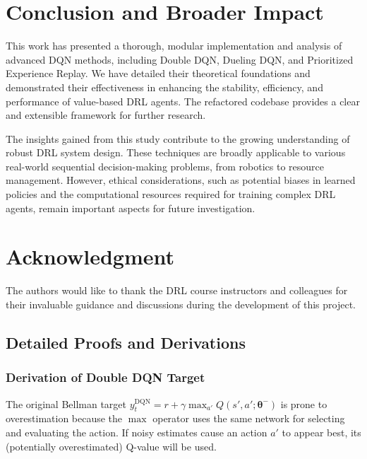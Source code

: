 \documentclass[conference]{IEEEtran}
\newcommand{\thetab}{\boldsymbol{\theta}}
\begin{document}
\section{Conclusion and Broader Impact}
This work has presented a thorough, modular implementation and analysis of advanced DQN methods, including Double DQN, Dueling DQN, and Prioritized Experience Replay. We have detailed their theoretical foundations and demonstrated their effectiveness in enhancing the stability, efficiency, and performance of value-based DRL agents. The refactored codebase provides a clear and extensible framework for further research.

The insights gained from this study contribute to the growing understanding of robust DRL system design. These techniques are broadly applicable to various real-world sequential decision-making problems, from robotics to resource management. However, ethical considerations, such as potential biases in learned policies and the computational resources required for training complex DRL agents, remain important aspects for future investigation.

\section*{Acknowledgment}
The authors would like to thank the DRL course instructors and colleagues for their invaluable guidance and discussions during the development of this project.




\appendix

\subsection{Detailed Proofs and Derivations}

\subsubsection{Derivation of Double DQN Target}
The original Bellman target \(y_t^{\text{DQN}} = r + \gamma \max_{a'} Q(s', a'; \thetab^-)\) is prone to overestimation because the \(\max\) operator uses the same network for selecting and evaluating the action. If noisy estimates cause an action \(a'\) to appear best, its (potentially overestimated) Q-value will be used.
\end{document}
